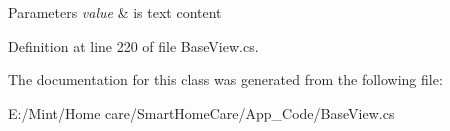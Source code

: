 \begin{DoxyParams}{Parameters}
{\em value} & is text content \\
\hline
\end{DoxyParams}


Definition at line 220 of file Base\-View.\-cs.



The documentation for this class was generated from the following file\-:\begin{DoxyCompactItemize}
\item 
E\-:/\-Mint/\-Home care/\-Smart\-Home\-Care/\-App\-\_\-\-Code/Base\-View.\-cs\end{DoxyCompactItemize}
